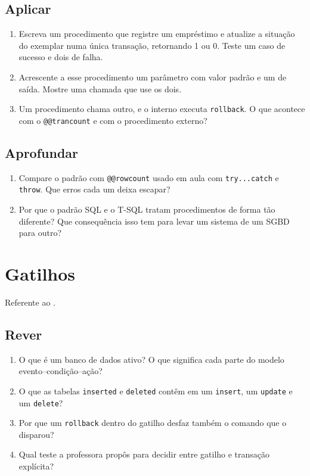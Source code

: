\subsection*{Aplicar}
\begin{enumerate}
	\item Escreva um procedimento que registre um empréstimo e atualize a
	situação do exemplar numa única transação, retornando 1 ou 0. Teste
	um caso de sucesso e dois de falha.
	\item Acrescente a esse procedimento um parâmetro com valor padrão e
	um de saída. Mostre uma chamada que use os dois.
	\item Um procedimento chama outro, e o interno executa
	\texttt{rollback}. O que acontece com o \texttt{@@trancount} e com o
	procedimento externo?
\end{enumerate}

\subsection*{Aprofundar}
\begin{enumerate}
	\item Compare o padrão com \texttt{@@rowcount} usado em aula com
	\texttt{try...catch} e \texttt{throw}. Que erros cada um deixa
	escapar?
	\item Por que o padrão SQL e o T-SQL tratam procedimentos de forma tão
	diferente? Que consequência isso tem para levar um sistema de um SGBD
	para outro?
\end{enumerate}

\section{Gatilhos}

Referente ao .

\subsection*{Rever}
\begin{enumerate}
	\item O que é um banco de dados ativo? O que significa cada parte do
	modelo evento--condição--ação?
	\item O que as tabelas \texttt{inserted} e \texttt{deleted} contêm em
	um \texttt{insert}, um \texttt{update} e um \texttt{delete}?
	\item Por que um \texttt{rollback} dentro do gatilho desfaz também o
	comando que o disparou?
	\item Qual teste a professora propôs para decidir entre gatilho e
	transação explícita?
\end{enumerate}

